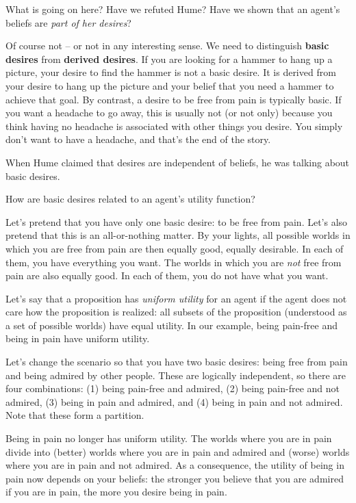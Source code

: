 What is going on here? Have we refuted Hume? Have we shown that an
agent's beliefs are \emph{part of her desires}? 

Of course not -- or not in any interesting sense. We need to distinguish
\textbf{basic desires} from \textbf{derived desires}. If you are looking for a
hammer to hang up a picture, your desire to find the hammer is not a basic
desire. It is derived from your desire to hang up the picture and your
belief that you need a hammer to achieve that goal. By contrast, a desire to be
free from pain is typically basic. If you want a headache to go away, this is
usually not (or not only) because you think having no headache is associated
with other things you desire. You simply don't want to have a headache, and
that's the end of the story.

When Hume claimed that desires are independent of beliefs, he was
talking about basic desires.

How are basic desires related to an agent's utility function?

Let's pretend that you have only one basic desire: to be free from pain. Let's
also pretend that this is an all-or-nothing matter. By your lights, all possible
worlds in which you are free from pain are then equally good, equally desirable.
In each of them, you have everything you want. The worlds in which you are
\emph{not} free from pain are also equally good. In each of them, you do not
have what you want.

Let's say that a proposition has \emph{uniform utility} for an agent if the
agent does not care how the proposition is realized: all subsets of the
proposition (understood as a set of possible worlds) have equal utility. In our
example, being pain-free and being in pain have uniform utility.

Let's change the scenario so that you have two basic desires: being free from
pain and being admired by other people. These are logically independent, so
there are four combinations: (1) being pain-free and admired, (2) being
pain-free and not admired, (3) being in pain and admired, and (4) being in pain
and not admired. Note that these form a partition.

Being in pain no longer has uniform utility. The worlds where you are in pain
divide into (better) worlds where you are in pain and admired and (worse) worlds
where you are in pain and not admired. As a consequence, the utility of being in
pain now depends on your beliefs: the stronger you believe that you are admired
if you are in pain, the more you desire being in pain.

